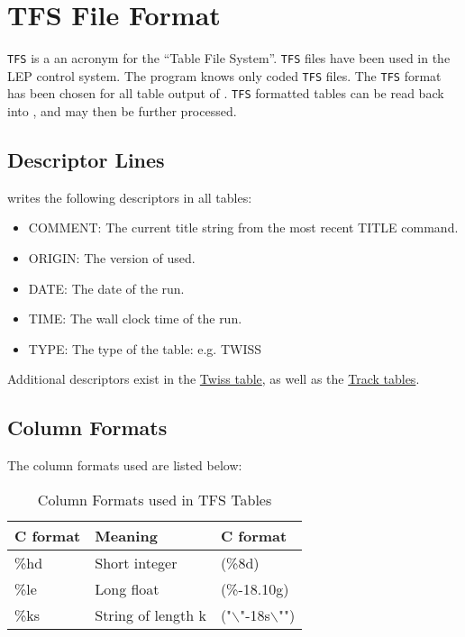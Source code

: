 
\chapter{TFS File Format}
\label{chap:tfs}

\texttt{TFS}\cite{TFS} is a an acronym for the ``Table File
System''. \texttt{TFS} files have been used in the LEP control
system. The \mad program knows only coded \texttt{TFS} files. The
\texttt{TFS} format has been chosen for all table output of
\madx. \texttt{TFS} formatted tables can be read back into \madx, and
may then be further processed. 
 
\section{Descriptor Lines}
\label{sec:tfs_desc}

\madx writes the following descriptors in all tables: 
\begin{itemize}
   \item COMMENT: The current title string from the most recent TITLE command. 
   \item ORIGIN: The version of \madx used. 
   \item DATE: The date of the \madx run. 
   \item TIME: The wall clock time of the \madx run. 
   \item TYPE: The type of the table: e.g. TWISS 
\end{itemize} 

Additional descriptors exist in the \href{twiss_desc.html}{Twiss table},
as well as the \href{tables.html#track}{Track tables}.  



\section{Column Formats}
\label{sec:tfs_columns}

The column formats used are listed below: 

\begin{table}[ht]
  \begin{center}
    \caption{ Column Formats used in TFS Tables}    
    \vspace{1ex}
    \begin{tabular}{|l l l|}
      \hline
      \textbf{C format} & \textbf{Meaning} & \textbf{C format} \\ 
      \hline
      \%hd & Short integer & (\%8d) \\ 
      \%le & Long float & (\%-18.10g) \\ 
      \%ks & String of length k & ("$\backslash$"-18s$\backslash$"")\\
      \hline
   \end{tabular}
  \end{center}
\end{table}

